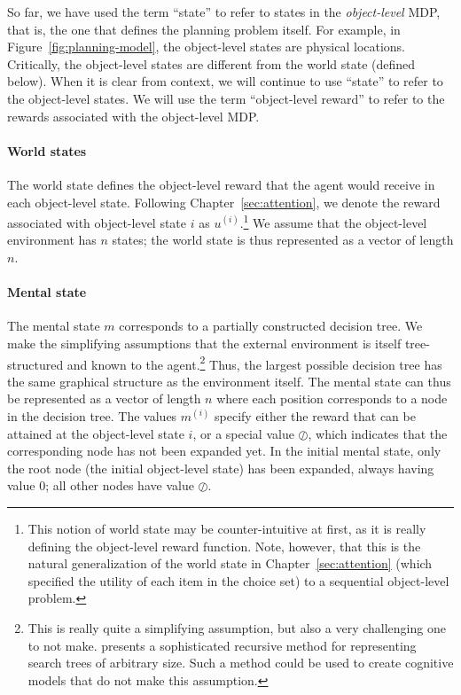 So far, we have used the term ``state'' to refer to states in the \emph{object-level} MDP, that is, the one that defines the planning problem itself. For example, in Figure~\ref{fig:planning-model}, the object-level states are physical locations. Critically, the object-level states are different from the world state (defined below). When it is clear from context, we will continue to use ``state'' to refer to the object-level states. We will use the term ``object-level reward'' to refer to the rewards associated with the object-level MDP.

\paragraph{World states}

The world state defines the object-level reward that the agent would receive in each object-level state. Following Chapter~\ref{sec:attention}, we denote the reward associated with object-level state $i$ as $u^{(i)}$.\footnote{%
  This notion of world state may be counter-intuitive at first, as it is really defining the object-level reward function. Note, however, that this is the natural generalization of the world state in Chapter~\ref{sec:attention} (which specified the utility of each item in the choice set) to a sequential object-level problem.
} We assume that the object-level environment has $n$ states; the world state is thus represented as a vector of length $n$. 

\paragraph{Mental state}

The mental state $m$ corresponds to a partially constructed decision tree. We make the simplifying assumptions that the external environment is itself tree-structured and known to the agent.\footnote{%
  This is really quite a simplifying assumption, but also a very challenging one to not make. \citet[Section 5.2]{hay2016principles} presents a sophisticated recursive method for representing search trees of arbitrary size. Such a method could be used to create cognitive models that do not make this assumption.
} Thus, the largest possible decision tree has the same graphical structure as the environment itself. The mental state can thus be represented as a vector of length $n$ where each position corresponds to a node in the decision tree. The values $m^{(i)}$ specify either the reward that can be attained at the object-level state $i$, or a special value $\oslash$, which indicates that the corresponding node has not been expanded yet. In the initial mental state, only the root node (the initial object-level state) has been expanded, always having value $0$; all other nodes have value $\oslash$.

